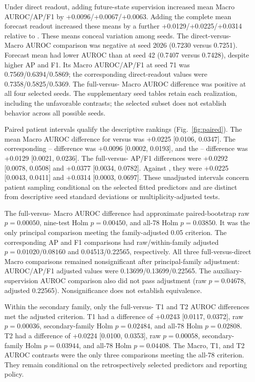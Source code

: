 Under direct readout, adding future-state supervision increased mean Macro AUROC/AP/F1 by +0.0096/+0.0067/+0.0063. Adding the complete mean forecast readout increased these means by a further +0.0129/+0.0225/+0.0314 relative to \direct{}. These means conceal variation among seeds. The direct-versus-\nojepa{} Macro AUROC comparison was negative at seed 2026 (0.7230 versus 0.7251). Forecast mean had lower AUROC than \direct{} at seed 42 (0.7407 versus 0.7428), despite higher AP and F1. Its Macro AUROC/AP/F1 at seed 71 was 0.7569/0.6394/0.5869; the corresponding direct-readout values were 0.7358/0.5825/0.5369. The full-versus-\nojepa{} Macro AUROC difference was positive at all four selected seeds. The supplementary seed tables retain each realization, including the unfavorable contrasts; the selected subset does not establish behavior across all possible seeds.


Paired patient intervals qualify the descriptive rankings (Fig.~\ref{fig:paired}). The mean Macro AUROC difference for \fullmodel{} versus \nojepa{} was +0.0225 [0.0106, 0.0347]. The corresponding \direct{}--\nojepa{} difference was +0.0096 [0.0002, 0.0193], and the \fullmodel{}--\direct{} difference was +0.0129 [0.0021, 0.0236]. The full-versus-\nojepa{} AP/F1 differences were +0.0292 [0.0078, 0.0508] and +0.0377 [0.0034, 0.0782]. Against \direct{}, they were +0.0225 [0.0043, 0.0411] and +0.0314 [0.0003, 0.0697]. These unadjusted intervals concern patient sampling conditional on the selected fitted predictors and are distinct from descriptive seed standard deviations or multiplicity-adjusted tests.

The full-versus-\nojepa{} Macro AUROC difference had approximate paired-bootstrap raw $p=0.00050$, nine-test Holm $p=0.00450$, and all-78 Holm $p=0.03850$. It was the only principal comparison meeting the family-adjusted 0.05 criterion. The corresponding AP and F1 comparisons had raw/within-family adjusted $p=0.01020/0.08160$ and 0.04513/0.22565, respectively. All three full-versus-direct Macro comparisons remained nonsignificant after principal-family adjustment: AUROC/AP/F1 adjusted values were 0.13699/0.13699/0.22565. The auxiliary-supervision AUROC comparison also did not pass adjustment (raw $p=0.04678$, adjusted 0.22565). Nonsignificance does not establish equivalence.

Within the secondary family, only the full-versus-\nojepa{} T1 and T2 AUROC differences met the adjusted criterion. T1 had a difference of +0.0243 [0.0117, 0.0372], raw $p=0.00036$, secondary-family Holm $p=0.02484$, and all-78 Holm $p=0.02808$. T2 had a difference of +0.0224 [0.0100, 0.0353], raw $p=0.00058$, secondary-family Holm $p=0.03944$, and all-78 Holm $p=0.04408$. The Macro, T1, and T2 AUROC contrasts were the only three comparisons meeting the all-78 criterion. They remain conditional on the retrospectively selected predictors and reporting policy.

